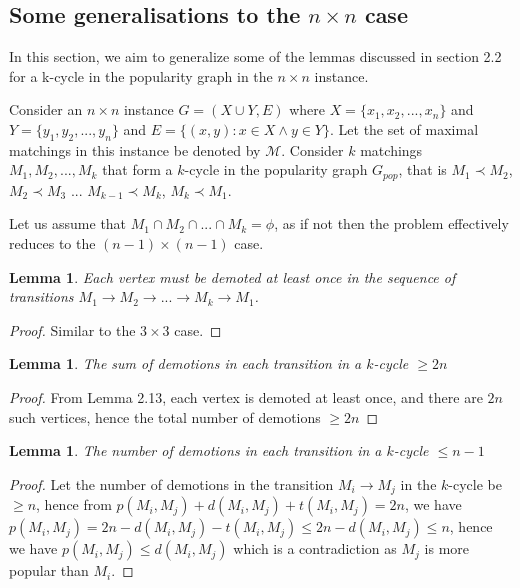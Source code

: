 \documentclass[a4paper,10pt]{article}
\theoremstyle{plain} %
\newtheorem{lemma}[theorem]{Lemma} %
\theoremstyle{plain} %
\begin{document}
\subsection{Some generalisations to the $n \times n$ case}
In this section, we aim to generalize some of the lemmas discussed in section 2.2 for a k-cycle in the popularity graph in the $n \times n$ instance.

Consider an $n \times n$ instance $G = (X \cup Y, E)$ where $X = \{x_1, x_2, ..., x_n\}$ and $Y = \{y_1, y_2, ..., y_n\}$ and $E = \{(x, y): x \in X \land y \in Y\}$. Let the set of maximal matchings in this instance be denoted by $\mathcal{M}$. Consider $k$ matchings $M_1, M_2, ..., M_k$ that form a $k$-cycle in the popularity graph $G_{pop}$, that is $M_1 \prec M_2$, $M_2 \prec M_3$ ... $M_{k-1} \prec M_k$, $M_k \prec M_1$.

Let us assume that $M_1 \cap M_2 \cap ... \cap M_k = \phi$, as if not then the problem effectively reduces to the $(n - 1) \times (n - 1)$ case.

\begin{lemma}
Each vertex must be demoted at least once in the sequence of transitions $M_1 \rightarrow M_2 \rightarrow ... \rightarrow M_k \rightarrow M_1$.
\end{lemma}

\begin{proof}
Similar to the $3 \times 3$ case.
\end{proof}

\begin{lemma}
    The sum of demotions in each transition in a $k$-cycle $\geq 2n$
\end{lemma}

\begin{proof}
    From Lemma 2.13, each vertex is demoted at least once, and there are $2n$ such vertices, hence the total number of demotions $\geq 2n$
\end{proof}

\begin{lemma}
    The number of demotions in each transition in a $k$-cycle $ \leq n-1$
\end{lemma}

\begin{proof}
    Let the number of demotions in the transition $M_i \rightarrow M_j$ in the $k$-cycle be $\geq n$, hence from $p(M_i, M_j) + d(M_i, M_j) + t(M_i, M_j) = 2n$, we have $p(M_i, M_j) = 2n - d(M_i, M_j) - t(M_i, M_j) \leq 2n - d(M_i, M_j) \leq n$, hence we have $p(M_i, M_j) \leq d(M_i, M_j)$ which is a contradiction as $M_j$ is more popular than $M_i$.
\end{proof}
\end{document}
